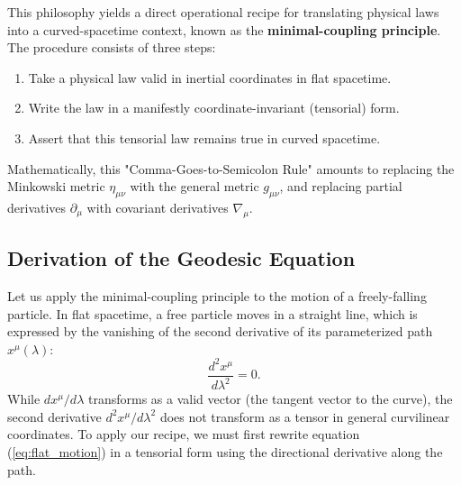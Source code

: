 \documentclass[11pt, a4paper]{report}
\begin{document}
This philosophy yields a direct operational recipe for translating physical laws into a curved-spacetime context, known as the \textbf{minimal-coupling principle}. The procedure consists of three steps:
\begin{enumerate}
    \item Take a physical law valid in inertial coordinates in flat spacetime.
    \item Write the law in a manifestly coordinate-invariant (tensorial) form.
    \item Assert that this tensorial law remains true in curved spacetime.
\end{enumerate}
Mathematically, this "Comma-Goes-to-Semicolon Rule" amounts to replacing the Minkowski metric $\eta_{\mu\nu}$ with the general metric $g_{\mu\nu}$, and replacing partial derivatives $\partial_{\mu}$ with covariant derivatives $\nabla_{\mu}$.

\subsection*{Derivation of the Geodesic Equation}
Let us apply the minimal-coupling principle to the motion of a freely-falling particle. In flat spacetime, a free particle moves in a straight line, which is expressed by the vanishing of the second derivative of its parameterized path $x^{\mu}(\lambda)$:
\begin{equation}
\label{eq:flat_motion}
\frac{d^{2}x^{\mu}}{d\lambda^{2}} = 0.
\end{equation}
While $dx^{\mu}/d\lambda$ transforms as a valid vector (the tangent vector to the curve), the second derivative $d^{2}x^{\mu}/d\lambda^{2}$ does not transform as a tensor in general curvilinear coordinates. To apply our recipe, we must first rewrite equation (\ref{eq:flat_motion}) in a tensorial form using the directional derivative along the path. 
\end{document}
